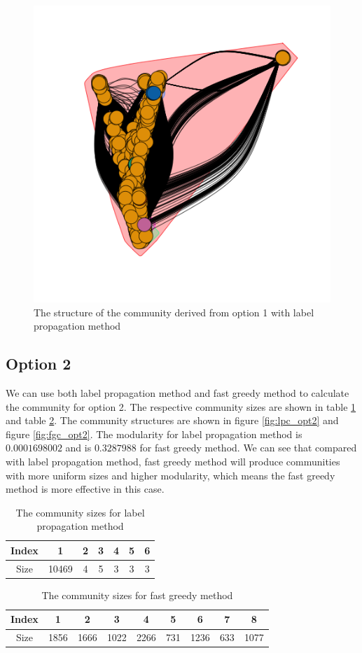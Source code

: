 \documentclass{article}
\begin{document}
\begin{figure}[htbp]
\centering
\captionsetup{justification=centering,margin=2cm}
\includegraphics[width=.6\textwidth]{lpc_opt1.png}
\caption{The structure of the community derived from option 1 with label propagation method}
\label{fig:lpc_opt1}
\end{figure}

\subsection{Option 2}
We can use both label propagation method and fast greedy method to calculate the community for option 2. The respective community sizes are shown in table \ref{tb:p3_comsize_lpc} and table \ref{tb:p3_comsize_fgc}. 
The community structures are shown in figure \ref{fig:lpc_opt2} and figure \ref{fig:fgc_opt2}. The modularity for label propagation method is $0.0001698002$ and is $0.3287988$ for fast greedy method.
We can see that compared with label propagation method, fast greedy method will produce communities with more uniform sizes and higher modularity, which means the fast greedy method is more effective in this case.
\begin {table}[htbp]
\caption{The community sizes for label propagation method}
\begin{adjustbox}{center}
\label{tb:p3_comsize_lpc}
\begin{tabular}{|c|c|c|c|c|c|c|}
\hline
Index&1&2&3&4&5&6\\
\hline
Size&10469&4&5&3&3&3\\
\hline
\end{tabular}
\end{adjustbox}
\end{table}

\begin {table}[htbp]
\caption{The community sizes for fast greedy method}
\begin{adjustbox}{center}
\label{tb:p3_comsize_fgc}
\begin{tabular}{|c|c|c|c|c|c|c|c|c|}
\hline
Index&1&2&3&4&5&6&7&8\\
\hline
Size&1856&1666&1022&2266&731&1236&633&1077\\
\hline
\end{tabular}
\end{adjustbox}
\end{table}
\end{document}
